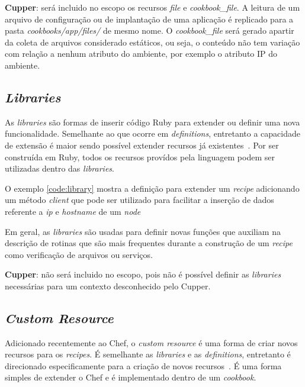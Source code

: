 \textbf{Cupper}: será incluido no escopo os recursos \textit{file} e \textit{cookbook\_file}.
A leitura de um arquivo de configuração ou de implantação de uma aplicação 
é replicado para a pasta \textit{cookbooks/app/files/} de mesmo nome.
O \textit{cookbook\_file} será gerado apartir da coleta de arquivos considerado estáticos,
ou seja, o conteúdo não tem variação com relação a nenhum atributo do ambiente,
por exemplo o atributo IP do ambiente.

\subsection{\textit{Libraries}}

As \textit{libraries} são formas de inserir código Ruby para extender ou definir
uma nova funcionalidade. Semelhante ao que ocorre em \textit{definitions}, entretanto a
capacidade de extensão é maior sendo possível extender recursos já
existentes~\cite{chefdoc:2016}. Por ser construída em Ruby, todos os
recursos provídos pela linguagem podem ser utilizadas dentro das
\textit{libraries}.

O exemplo \ref{code:library} mostra a definição para extender um
\textit{recipe} adicionando um método \textit{client} que pode ser utilizado
para facilitar a inserção de dados referente a \textit{ip} e \textit{hostname} de um
\textit{node}

\begin{minipage}{.90\textwidth}
  \lstset{style=shell}
  
\end{minipage}

Em geral, as \textit{libraries} são usadas para definir novas funções que
auxiliam na descrição de rotinas que são mais frequentes durante a
construção de um \textit{recipe} como verificação de arquivos ou serviços.

\textbf{Cupper}: não será incluido no escopo, pois não é possível definir as \textit{libraries}
necessárias para um contexto desconhecido pelo Cupper.

\subsection{\textit{Custom Resource}}
\label{sec:lev-rec-cust}

Adicionado recentemente ao Chef, o \textit{custom resource} é uma forma de criar
novos recursos para os \textit{recipes}. É semelhante as \textit{libraries} e as \textit{definitions},
entretanto é direcionado especificamente para a criação de novos recursos~\cite{chefdoc:2016}.
É uma forma simples de extender o Chef e é implementado dentro de um
\textit{cookbook}.

